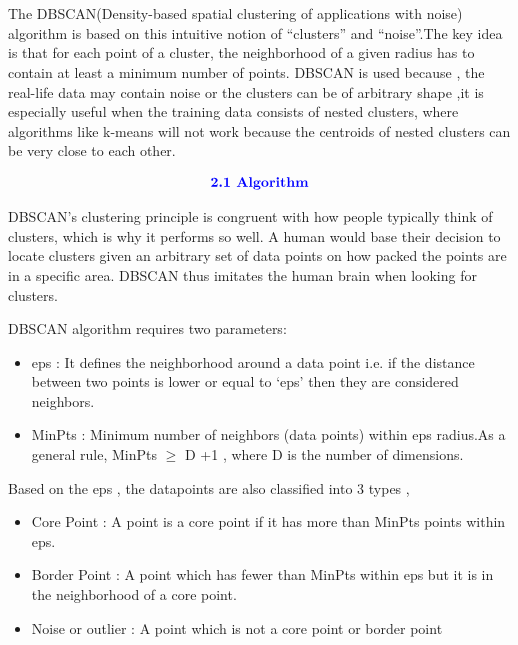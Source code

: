 \documentclass[12pt,a4paper]{article}
\begin{document}
{\section{}
The DBSCAN(Density-based spatial clustering of applications with noise) algorithm is based on this intuitive notion of “clusters” and “noise”.The key idea is that for each point of a cluster, the neighborhood of a given radius has to contain at least a minimum number of points. DBSCAN is used because , the real-life data may contain noise or the clusters can be of arbitrary shape ,it is especially useful when the training
data consists of nested clusters, where algorithms like k-means will not work because the centroids of
nested clusters can be very close to each other.

\begin{align*}
    \textcolor{blue}{\text{{\textbf{2.1 Algorithm}}}}
\end{align*}

DBSCAN's clustering principle is congruent with how people typically think of clusters, which is why it performs so well. A human would base their decision to locate clusters given an arbitrary set of data points on how packed the points are in a specific area. DBSCAN thus imitates the human brain when looking for clusters.

DBSCAN algorithm requires two parameters:

\begin{itemize}
    \item eps : It defines the neighborhood around a data point i.e. if the distance between two points is lower or equal to ‘eps’ then they are considered neighbors.
    \item MinPts : Minimum number of neighbors (data points) within eps radius.As a general rule, MinPts $\ge$ D +1 , where D is the number of dimensions.
\end{itemize}

Based on the eps , the datapoints are also classified into 3 types ,
\begin{itemize}
    \item Core Point : A point is a core point if it has more than MinPts points within eps.
    \item Border Point : A point which has fewer than MinPts within eps but it is in the neighborhood of a core point.
    \item Noise or outlier : A point which is not a core point or border point
\end{itemize}

}
\end{document}
